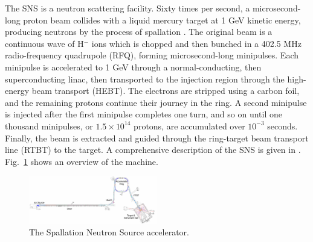 The SNS is a neutron scattering facility. Sixty times per second, a microsecond-long proton beam collides with a liquid mercury target at 1 GeV kinetic energy, producing neutrons by the process of spallation \cite{Russell1990}. The original beam is a continuous wave of H$^-$ ions which is chopped and then bunched in a 402.5 MHz radio-frequency quadrupole (RFQ), forming microsecond-long minipulses. Each minipulse is accelerated to 1 GeV through a normal-conducting, then superconducting linac, then transported to the injection region through the high-energy beam transport (HEBT). The electrons are stripped using a carbon foil, and the remaining protons continue their journey in the ring. A second minipulse is injected after the first minipulse completes one turn, and so on until one thousand minipulses, or $1.5 \times 10^{14}$ protons, are accumulated over $10^{-3}$ seconds. Finally, the beam is extracted and guided through the ring-target beam transport line (RTBT) to the target. A comprehensive description of the SNS is given in \cite{Henderson2014}. Fig.~\ref{fig:SNS} shows an overview of the machine.
%
\begin{figure}[!p]
    \centering
    \includegraphics[angle=-90, width=0.5\textwidth]{Images/chapter1/SNS.png}
    \caption{The Spallation Neutron Source accelerator.}
    \label{fig:SNS}
\end{figure}
%

